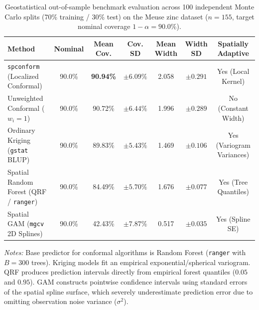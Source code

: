 \documentclass[11pt,a4paper]{article}
\begin{document}
\begin{table}[htbp]
\centering
\small
\begin{threeparttable}
\caption{Geostatistical out-of-sample benchmark evaluation across 100 independent Monte Carlo splits (70\% training / 30\% test) on the Meuse zinc dataset ($n = 155$, target nominal coverage $1-\alpha = 90.0\%$).}
\label{tab:geostatistical_benchmark}
\begin{tabular}{lcccccc}
\toprule
\textbf{Method} & \textbf{Nominal} & \textbf{Mean Cov.} & \textbf{Cov. SD} & \textbf{Mean Width} & \textbf{Width SD} & \textbf{Spatially Adaptive} \\
\midrule
\texttt{spconform} (Localized Conformal) & 90.0\% & \textbf{90.94\%} & $\pm 6.09\%$ & 2.058 & $\pm 0.291$ & Yes (Local Kernel) \\
Unweighted Conformal ($w_i = 1$) & 90.0\% & 90.72\% & $\pm 6.44\%$ & 1.996 & $\pm 0.289$ & No (Constant Width) \\
Ordinary Kriging (\texttt{gstat} BLUP) & 90.0\% & 89.83\% & $\pm 5.43\%$ & 1.469 & $\pm 0.106$ & Yes (Variogram Variances) \\
Spatial Random Forest (QRF / \texttt{ranger}) & 90.0\% & 84.49\% & $\pm 5.70\%$ & 1.676 & $\pm 0.077$ & Yes (Tree Quantiles) \\
Spatial GAM (\texttt{mgcv} 2D Splines) & 90.0\% & 42.43\% & $\pm 7.87\%$ & 0.517 & $\pm 0.035$ & Yes (Spline SE) \\
\bottomrule
\end{tabular}
\begin{tablenotes}[flushleft]
\footnotesize
\item \textit{Notes:} Base predictor for conformal algorithms is Random Forest (\texttt{ranger} with $B=300$ trees). Kriging models fit an empirical exponential/spherical variogram. QRF produces prediction intervals directly from empirical forest quantiles ($0.05$ and $0.95$). GAM constructs pointwise confidence intervals using standard errors of the spatial spline surface, which severely underestimate prediction error due to omitting observation noise variance ($\sigma^2$).
\end{tablenotes}
\end{threeparttable}
\end{table}

\vspace{1.5em}
\end{document}
